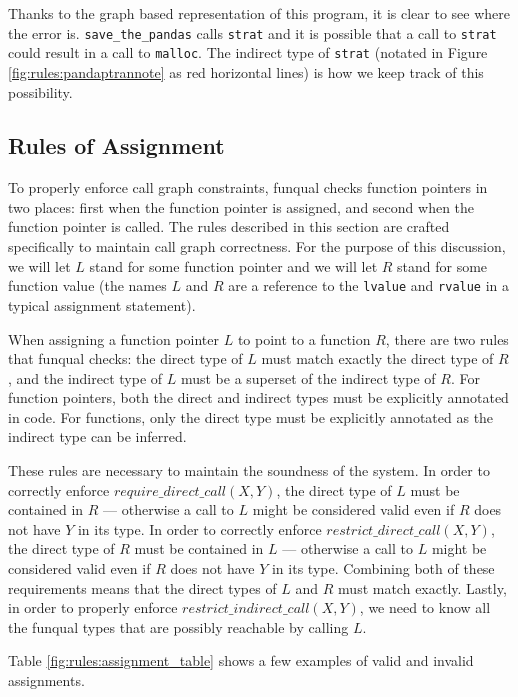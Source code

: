 Thanks to the graph based representation of this program, it is clear to see where the error is.  \lstinline{save_the_pandas} calls \lstinline{strat} and it is possible that a call to \lstinline{strat} could result in a call to \lstinline{malloc}.  The indirect type of \lstinline{strat} (notated in Figure \ref{fig:rules:pandaptrannote} as red horizontal lines) is how we keep track of this possibility.  

\subsection{Rules of Assignment}

To properly enforce call graph constraints, funqual checks function pointers in two places:  first when the function pointer is assigned, and second when the function pointer is called.  The rules described in this section are crafted specifically to maintain call graph correctness.  For the purpose of this discussion, we will let $L$ stand for some function pointer and we will let $R$ stand for some function value (the names $L$ and $R$ are a reference to the \lstinline{lvalue} and \lstinline{rvalue} in a typical assignment statement).  

When assigning a function pointer $L$ to point to a function $R$, there are two rules that funqual checks:  the direct type of $L$ must match exactly the direct type of $R$, and the indirect type of $L$ must be a superset of the indirect type of $R$.  For function pointers, both the direct and indirect types must be explicitly annotated in code.  For functions, only the direct type must be explicitly annotated as the indirect type can be inferred.  

These rules are necessary to maintain the soundness of the system.  In order to correctly enforce $require\_direct\_call(X, Y)$, the direct type of $L$ must be contained in $R$ --- otherwise a call to $L$ might be considered valid even if $R$ does not have $Y$ in its type.  In order to correctly enforce $restrict\_direct\_call(X, Y)$, the direct type of $R$ must be contained in $L$ --- otherwise a call to $L$ might be considered valid even if $R$ does not have $Y$ in its type.  Combining both of these requirements means that the direct types of $L$ and $R$ must match exactly.  Lastly, in order to properly enforce $restrict\_indirect\_call(X, Y)$, we need to know all the funqual types that are possibly reachable by calling $L$.  

Table \ref{fig:rules:assignment_table} shows a few examples of valid and invalid assignments.  

